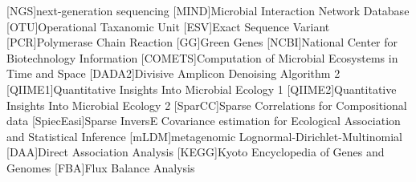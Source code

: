 
\begin{acronym}[XXXXXXXX]
    [NGS]{next-generation sequencing}
    [MIND]{Microbial Interaction Network Database}
    [OTU]{Operational Taxanomic Unit}
    [ESV]{Exact Sequence Variant}
    [PCR]{Polymerase Chain Reaction}
    [GG]{Green Genes}
    [NCBI]{National Center for Biotechnology Information}
    [COMETS]{Computation of Microbial Ecosystems in Time and Space}
    [DADA2]{Divisive Amplicon Denoising Algorithm 2}
    [QIIME1]{Quantitative Insights Into Microbial Ecology 1}
    [QIIME2]{Quantitative Insights Into Microbial Ecology 2}
    [SparCC]{Sparse Correlations for Compositional data}
    [SpiecEasi]{Sparse InversE Covariance estimation for Ecological Association and Statistical Inference}
    [mLDM]{metagenomic Lognormal-Dirichlet-Multinomial}
    [DAA]{Direct Association Analysis}
    [KEGG]{Kyoto Encyclopedia of Genes and Genomes}
    [FBA]{Flux Balance Analysis}
\end{acronym}
